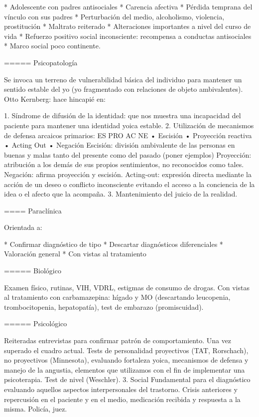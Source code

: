 \documentclass[encares.tex]{subfiles}
\begin{document}
* Adolescente con padres antisociales
* Carencia afectiva
* Pérdida temprana del vínculo con sus padres
* Perturbación del medio, alcoholismo, violencia, prostitución
* Maltrato reiterado
* Alteraciones importantes a nivel del curso de vida
* Refuerzo positivo social inconsciente: recompensa a conductas antisociales
* Marco social poco continente.

===== Psicopatología

Se invoca un terreno de vulnerabilidad básica del individuo para mantener un sentido estable del yo (yo fragmentado con relaciones de objeto ambivalentes). Otto Kernberg: hace hincapié en:

1. Síndrome de difusión de la identidad: que nos muestra una incapacidad del paciente para mantener una identidad yoica estable.
2. Utilización de mecanismos de defensa arcaicos primarios: ES PRO AC NE • Escisión • Proyección reactiva • Acting Out • Negación Escisión: división ambivalente de las personas en buenas y malas tanto del presente como del pasado (poner ejemplos) Proyección: atribución a los demás de sus propios sentimientos, no reconocidos como tales. Negación: afirma proyección y escisión. Acting-out: expresión directa mediante la acción de un deseo o conflicto inconsciente evitando el acceso a la conciencia de la idea o el afecto que la acompaña.
3. Mantenimiento del juicio de la realidad.

==== Paraclínica

Orientada a:

* Confirmar diagnóstico de tipo
* Descartar diagnósticos diferenciales
* Valoración general
* Con vistas al tratamiento

===== Biológico

Examen físico, rutinas, VIH, VDRL, estigmas de consumo de drogas. Con vistas al tratamiento con carbamazepina: hígado y MO (descartando leucopenia, trombocitopenia, hepatopatía), test de embarazo (promiscuidad).

===== Psicológico

Reiteradas entrevistas para confirmar patrón de comportamiento. Una vez superado el cuadro actual. Tests de personalidad proyectivos (TAT, Rorschach), no proyectivos (Minnesota), evaluando fortaleza yoica, mecanismos de defensa y manejo de la angustia, elementos que utilizamos con el fin de implementar una psicoterapia. Test de nivel (Weschler). 3. Social Fundamental para el diagnóstico evaluando aquellos aspectos interpersonales del trastorno. Crisis anteriores y repercusión en el paciente y en el medio, medicación recibida y respuesta a la misma. Policía, juez.
\end{document}

